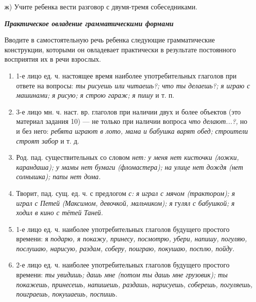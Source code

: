\documentclass[a5paper]{book}
\renewcommand{\emph}[1]{\textit{#1}}
\begin{document}
ж) Учите ребенка вести разговор с двумя-тремя собеседниками.

\emph{\textbf{Практическое овладение грамматическими формами}}

Вводите в самостоятельную речь ребенка следующие грамматические
конструкции, которыми он овладевает практически в результате постоянного
восприятия их в речи взрослых.


\begin{enumerate}
\def\labelenumi{\arabic{enumi}.}
\item
  
  1-е лицо ед. ч. настоящее время наиболее употребительных глаголов при
  ответе на вопросы: \emph{ты рисуешь или читаешь?; что ты делаешь?; я
  играю с машинами; я рисую; я строю гараж; я пишу} и т. п.
  
\item
  
  3-е лицо мн. ч. наст. вр. глаголов при наличии двух и более объектов
  (это материал задания 10) --- не только при наличии вопроса \emph{что
  делают...?,} но и без него: \emph{ребята играют в лото, мама и бабушка
  варят обед; строители строят забор} и т. д.
  
\item
  
  Род. пад. существительных со словом \emph{нет: у меня нет кисточки
  (ложки, карандаша); у мамы нет бумаги (фломастера); на улице нет дождя
  (нет солнышка); папы нет дома.}
  
\item
  
  Творит, пад. сущ. ед. ч. с предлогом \emph{с: я играл с мячом
  (трактором); я играл с Петей (Максимом, девочкой, мальчиком); я}
  гу\emph{лял с бабушкой; я ходил в кино с тётей Таней.}
  
\item
  
  1-е лицо ед. ч. наиболее употребительных глаголов будущего простого
  времени: я \emph{подарю, я покажу, принесу, посмотрю, убери, напишу,
  погуляю, послушаю, нарисую, раздам, соберу, поиграю, покушаю, посплю,
  пойду.}
  
\item
  
  2-е лицо ед. ч. наиболее употребительных глаголов будущего простого
  времени: \emph{ты увидишь; дашь мне (потом ты дашь мне грузовик); ты
  покажешь, принесешь, напишешь, раздашь, нарисуешь, соберешь,
  погуляешь, поиграешь, покушаешь, поспишь.}
  

\end{enumerate}
\end{document}
